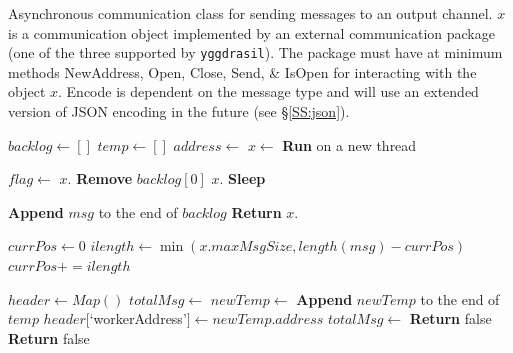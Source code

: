 \documentclass[journal]{IEEEtran}
\newcommand{\pkg}{{\tt yggdrasil}{}}
\begin{document}
\begin{appendices}
\begin{algorithm}[H]
    \caption{Asynchronous communication class for sending messages to an output channel. $x$ is a communication object implemented by an external communication package (one of the three supported by {\pkg}). The package must have at minimum methods {\sc NewAddress, Open, Close, Send, \& IsOpen} for interacting with the object $x$. {\sc Encode} is dependent on the message type and will use an extended version of JSON encoding in the future (see \S\ref{SS:json}).}
    \label{alg:async_send}
    \begin{algorithmic}[1]
    	\State $backlog \gets []$
	\State $temp \gets []$
		\State $address \gets$ 
	\EndIf
	\State $x \gets$ 
	\State \textbf{Run}  on a new thread
	\item[]
				\State $flag \gets$ $x.$
					\State \textbf{Remove} $backlog[0]$
				\Else
					\State $x.$
				\EndIf
			\Else
				\State \textbf{Sleep}
			\EndIf
    		\EndWhile
    	\EndClassMethod
	\item[]
			\State \textbf{Append} $msg$ to the end of $backlog$
		\EndIf
		\State \textbf{Return} $x.$
	\EndClassMethod
	\item[]
		\State $currPos \gets 0$
			\State $ilength \gets \min(x.maxMsgSize, length(msg) - currPos)$
			\State {}
			\State $currPos += ilength$
		\EndWhile
	\EndClassMethod
	\item[]
		\State $header \gets Map()$ 
		\State $totalMsg \gets $
			\State $newTemp \gets$ 
			\State \textbf{Append} $newTemp$ to the end of $temp$
			\State $header[$`workerAddress'$] \gets newTemp.address$
			\State $totalMsg \gets $
				\State \textbf{Return} false
			\EndIf
				\State \textbf{Return} false

\end{algorithmic}
\end{algorithm}
\end{appendices}
\end{document}

